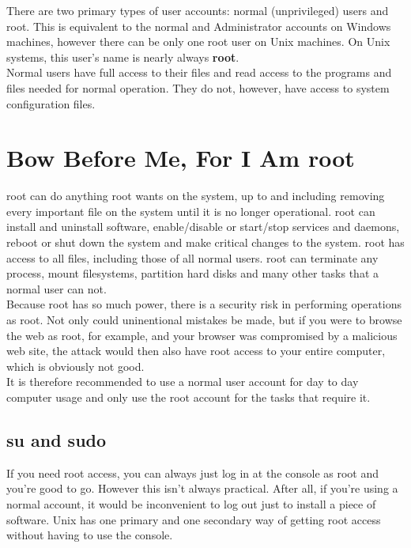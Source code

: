 There are two primary types of user accounts: normal (unprivileged) users and root.  This is equivalent to the normal and Administrator accounts on Windows machines, however there can be only one root user on Unix machines.  On Unix systems, this user's name is nearly always \textbf{root}.\\

Normal users have full access to their files and read access to the programs and files needed for normal operation.  They do not, however, have access to system configuration files.

\section{Bow Before Me, For I Am root}

root can do anything root wants on the system, up to and including removing every important file on the system until it is no longer operational.  root can install and uninstall software, enable/disable or start/stop services and daemons, reboot or shut down the system and make critical changes to the system.  root has access to all files, including those of all normal users.  root can terminate any process, mount filesystems, partition hard disks and many other tasks that a normal user can not.\\

Because root has so much power, there is a security risk in performing operations as root.  Not only could uninentional mistakes be made, but if you were to browse the web as root, for example, and your browser was compromised by a malicious web site, the attack would then also have root access to your entire computer, which is obviously not good.\\

It is therefore recommended to use a normal user account for day to day computer usage and only use the root account for the tasks that require it.

\subsection{su and sudo}

If you need root access, you can always just log in at the console as root and you're good to go.  However this isn't always practical.  After all, if you're using a normal account, it would be inconvenient to log out just to install a piece of software.  Unix has one primary and one secondary way of getting root access without having to use the console.\\

